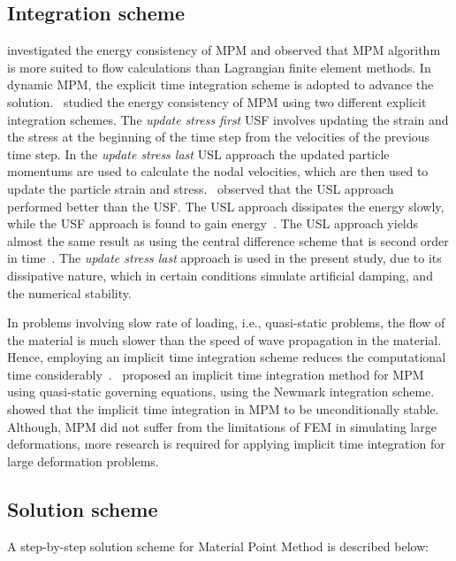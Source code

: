 \subsection{Integration scheme}

\citet{Love2006} investigated the energy consistency of MPM and observed that 
MPM algorithm is more suited to flow calculations than Lagrangian finite 
element methods. In dynamic MPM, the explicit time integration scheme is 
adopted to advance the solution.~\citet{Bardenhagen2002} studied the energy 
consistency of MPM using two 
different explicit integration schemes. The \textit{update stress first} USF
involves updating the strain and the stress at the beginning of the time step 
from the velocities of the previous time step. In the \textit{update stress 
last} USL approach the updated particle momentums are used to calculate the 
nodal velocities, which are then used to update the particle strain and 
stress.~\citet{Bardenhagen2002} observed that the USL approach performed better 
than the USF. The USL approach dissipates the energy slowly, while the USF 
approach is found to gain energy~\citep{Kafaji2013}. The USL approach yields 
almost the same result as using the central difference scheme that is second 
order in time~\citep{Wallstedt2008}. The \textit{update stress last} approach 
is used in the present study, due to its dissipative nature, which in certain 
conditions simulate artificial damping, and the numerical stability.

In problems involving slow rate of loading, i.e., quasi-static problems, the 
flow of the material is much slower than the speed of wave propagation in the 
material. Hence, employing an implicit time integration scheme reduces the 
computational time considerably~\citep{Kafaji2013}.~\citet{Guilkey2003a} 
proposed an implicit time integration method for MPM using quasi-static 
governing equations, using the Newmark integration scheme.~\citet{Love2006} 
showed that the implicit time integration in MPM to be unconditionally stable. 
Although, MPM did not suffer from the limitations of FEM in simulating large 
deformations, more research is required for applying implicit time integration 
for large deformation problems. 

\subsection{Solution scheme}
A step-by-step solution scheme for Material Point Method is described below:

